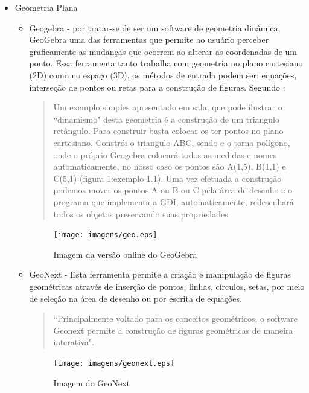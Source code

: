 \documentclass[12pt,a4paper]{article}
\begin{document}
\begin{itemize}
	\item Geometria Plana
	
	\begin{itemize}
		\item Geogebra - por tratar-se de ser um software de geometria dinâmica, GeoGebra uma das ferramentas que permite ao usuário perceber graficamente as mudanças que ocorrem ao alterar as coordenadas de um ponto. Essa ferramenta tanto trabalha com geometria no plano cartesiano (2D) como no espaço (3D), os métodos de entrada podem ser: equações, interseção de pontos ou retas para a construção de figuras. Segundo \cite{cardoso2010software}:
		
		\begin{quotation}
Um exemplo simples apresentado em sala, que pode ilustrar o ``dinamismo" desta geometria é a construção de um triangulo retângulo. Para construir basta colocar os ter pontos no plano cartesiano. Constrói o triangulo ABC, sendo e o torna polígono, onde o próprio Geogebra colocará todos as medidas e nomes automaticamente, no nosso caso os pontos são A(1,5), B(1,1) e C(5,1) (figura 1:exemplo 1.1). Uma vez efetuada a construção podemos mover os pontos A ou B ou C pela área de desenho e o programa que implementa a GDI, automaticamente, redesenhará todos os objetos preservando suas propriedades
		\end{quotation}

		\begin{figure}[htb]
			\centering
			\texttt{[image: imagens/geo.eps]} 
			\caption{Imagem da versão online do GeoGebra}
			\label{fig:imgGeogebra}
		\end{figure}

		\item GeoNext - Esta ferramenta permite a criação e manipulação de figuras geométricas através de inserção de pontos, linhas, círculos, setas, por meio de seleção na área de desenho ou por escrita de equações.
		
		\begin{quote}
``Principalmente voltado para os conceitos geométricos, o software Geonext permite a construção de figuras geométricas de maneira interativa". \citep{cardoso2010software}
		\end{quote}

		\begin{figure}[htb]
			\centering
			\texttt{[image: imagens/geonext.eps]} 
			\caption{Imagem do GeoNext}
			\label{fig:imgGeonext}
		\end{figure}


\end{itemize}
\end{itemize}
\end{document}
